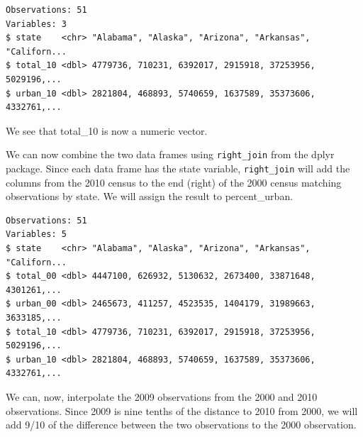 \documentclass[]{book}
\newenvironment{Shaded}{\begin{snugshade}}{\end{snugshade}}
\newcommand{\DataTypeTok}[1]{\textcolor[rgb]{0.13,0.29,0.53}{#1}}
\newcommand{\DecValTok}[1]{\textcolor[rgb]{0.00,0.00,0.81}{#1}}
\newcommand{\KeywordTok}[1]{\textcolor[rgb]{0.13,0.29,0.53}{\textbf{#1}}}
\newcommand{\NormalTok}[1]{#1}
\newcommand{\OperatorTok}[1]{\textcolor[rgb]{0.81,0.36,0.00}{\textbf{#1}}}
\newcommand{\StringTok}[1]{\textcolor[rgb]{0.31,0.60,0.02}{#1}}
\begin{document}
\begin{verbatim}
Observations: 51
Variables: 3
$ state    <chr> "Alabama", "Alaska", "Arizona", "Arkansas", "Californ...
$ total_10 <dbl> 4779736, 710231, 6392017, 2915918, 37253956, 5029196,...
$ urban_10 <dbl> 2821804, 468893, 5740659, 1637589, 35373606, 4332761,...
\end{verbatim}

We see that total\_10 is now a numeric vector.

We can now combine the two data frames using \texttt{right\_join} from the dplyr package. Since each data frame has the state variable, \texttt{right\_join} will add the columns from the 2010 census to the end (right) of the 2000 census matching observations by state. We will assign the result to percent\_urban.

\begin{Shaded}
\end{Shaded}

\begin{verbatim}
Observations: 51
Variables: 5
$ state    <chr> "Alabama", "Alaska", "Arizona", "Arkansas", "Californ...
$ total_00 <dbl> 4447100, 626932, 5130632, 2673400, 33871648, 4301261,...
$ urban_00 <dbl> 2465673, 411257, 4523535, 1404179, 31989663, 3633185,...
$ total_10 <dbl> 4779736, 710231, 6392017, 2915918, 37253956, 5029196,...
$ urban_10 <dbl> 2821804, 468893, 5740659, 1637589, 35373606, 4332761,...
\end{verbatim}

We can, now, interpolate the 2009 observations from the 2000 and 2010 observations. Since 2009 is nine tenths of the distance to 2010 from 2000, we will add 9/10 of the difference between the two observations to the 2000 observation.

\begin{Shaded}
\end{Shaded}
\end{document}
